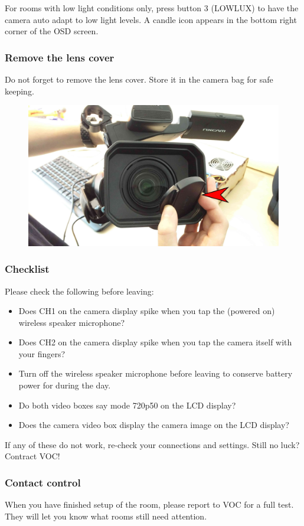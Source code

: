 \documentclass{article}
\begin{document}
For rooms with low light conditions only, press button 3 (LOWLUX) to have the camera auto adapt to low light levels. A candle icon appears in the bottom right corner of the OSD screen.

\subsubsection{Remove the lens cover}
Do not forget to remove the lens cover. Store it in the camera bag for safe keeping.

\begin{figure}[H]
  \centering
\includegraphics[width = 120mm]{Sony07.jpg}
\end{figure}

\subsubsection{Checklist}
Please check the following before leaving:
\begin{itemize}
  \item Does CH1 on the camera display spike when you tap the (powered on) wireless speaker microphone?
  \item Does CH2 on the camera display spike when you tap the camera itself with your fingers?
  \item Turn off the wireless speaker microphone before leaving to conserve battery power for during the day.
  \item Do both video boxes say mode 720p50 on the LCD display?
  \item Does the camera video box display the camera image on the LCD display?
\end{itemize}

If any of these do not work, re-check your connections and settings. Still no luck? Contract VOC!

\subsubsection{Contact control}
When you have finished setup of the room, please report to VOC for a full test.
They will let you know what rooms still need attention.
\end{document}
